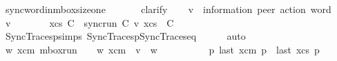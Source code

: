 \begin{isabellebody}
\ sync{\isacharunderscore}{\kern0pt}word{\isacharunderscore}{\kern0pt}in{\isacharunderscore}{\kern0pt}mbox{\isacharunderscore}{\kern0pt}size{\isacharunderscore}{\kern0pt}one{\isacharcolon}{\kern0pt}\isanewline
\ \ \ {\isachardoublequoteopen}{\isasymL}\isactrlsub {\isasymzero}\ {\isasymsubseteq}\ {\isasymL}\isactrlsub {\isasymone}{\isachardoublequoteclose}\isanewline
%
\isadelimproof
%
\endisadelimproof
%
\isatagproof
{}\isamarkupfalse%
\ clarify\isanewline
\ \ \isamarkupfalse%
\ v\ {\isacharcolon}{\kern0pt}{\isacharcolon}{\kern0pt}\ {\isachardoublequoteopen}{\isacharparenleft}{\kern0pt}{\isacharprime}{\kern0pt}information{\isacharcomma}{\kern0pt}\ {\isacharprime}{\kern0pt}peer{\isacharparenright}{\kern0pt}\ action\ word{\isachardoublequoteclose}\isanewline
\ \ \isamarkupfalse%
\ {\isachardoublequoteopen}v\ {\isasymin}\ {\isasymL}\isactrlsub {\isasymzero}{\isachardoublequoteclose}\isanewline
\ \ \isamarkupfalse%
\ \isamarkupfalse%
\ xcs\ C{}\ \ {\isachardoublequoteopen}sync{\isacharunderscore}{\kern0pt}run\ C{}\ v\ xcs{\isachardoublequoteclose}\ \ {\isachardoublequoteopen}C{}\ {\isacharequal}{\kern0pt}\ {\isasymC}\isactrlsub {\isasymI}\isactrlsub {\isasymzero}{\isachardoublequoteclose}\isanewline
\ \ \ \ \isamarkupfalse%
\ SyncTracesp{\isachardot}{\kern0pt}simps\ SyncTracesp{\isacharunderscore}{\kern0pt}SyncTraces{\isacharunderscore}{\kern0pt}eq\isanewline
\ \ \ \ \isamarkupfalse%
\ auto\isanewline
\ \ \isamarkupfalse%
\ {\isachardoublequoteopen}{\isasymexists}w\ xcm{\isachardot}{\kern0pt}\ mbox{\isacharunderscore}{\kern0pt}run\ {\isasymC}\isactrlsub {\isasymI}\isactrlsub {\isasymmm}\ {\isacharparenleft}{\kern0pt}{\isasymB}\ {}{\isacharparenright}{\kern0pt}\ w\ xcm\ {\isasymand}\ v\ {\isacharequal}{\kern0pt}\ w{\isasymdown}\isactrlsub {\isacharbang}{\kern0pt}\ {\isasymand}\isanewline
\ \ \ \ \ \ \ \ \ {\isacharparenleft}{\kern0pt}{\isasymforall}p{\isachardot}{\kern0pt}\ last\ {\isacharparenleft}{\kern0pt}{\isasymC}\isactrlsub {\isasymI}\isactrlsub {\isasymmm}{\isacharhash}{\kern0pt}xcm{\isacharparenright}{\kern0pt}\ p\ {\isacharequal}{\kern0pt}\ {\isacharparenleft}{\kern0pt}last\ {\isacharparenleft}{\kern0pt}{\isasymC}\isactrlsub {\isasymI}\isactrlsub {\isasymzero}{\isacharhash}{\kern0pt}xcs{\isacharparenright}{\kern0pt}\ p{\isacharcomma}{\kern0pt}\ {\isasymepsilon}{\isacharparenright}{\kern0pt}{\isacharparenright}{\kern0pt}{\isachardoublequoteclose}\isanewline

\end{isabellebody}
